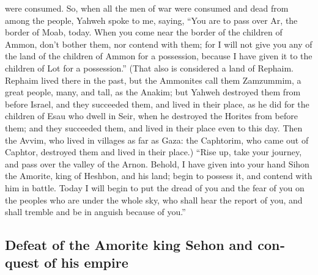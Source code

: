 \begin{paracol}{2}
\begin{otherlanguage}{english}
were consumed.  So, when all the men of war were consumed
and dead from among the people,  Yahweh spoke to me,
saying,  ``You are to pass over Ar, the border of Moab,
today.  When you come near the border of the children of
Ammon, don't bother them, nor contend with them; for I will not give you
any of the land of the children of Ammon for a possession, because I
have given it to the children of Lot for a possession.'' 
(That also is considered a land of Rephaim. Rephaim lived there in the
past, but the Ammonites call them Zamzummim,  a great
people, many, and tall, as the Anakim; but Yahweh destroyed them from
before Israel, and they succeeded them, and lived in their place,
 as he did for the children of Esau who dwell in Seir,
when he destroyed the Horites from before them; and they succeeded them,
and lived in their place even to this day.  Then the
Avvim, who lived in villages as far as Gaza: the Caphtorim, who came out
of Caphtor, destroyed them and lived in their place.) 
``Rise up, take your journey, and pass over the valley of the Arnon.
Behold, I have given into your hand Sihon the Amorite, king of Heshbon,
and his land; begin to possess it, and contend with him in battle.
 Today I will begin to put the dread of you and the fear
of you on the peoples who are under the whole sky, who shall hear the
report of you, and shall tremble and be in anguish because of you.''

\hypertarget{defeat-of-the-amorite-king-sehon-and-conquest-of-his-empire}{%
\subsection{Defeat of the Amorite king Sehon and conquest of his
empire}\label{defeat-of-the-amorite-king-sehon-and-conquest-of-his-empire}}


\end{otherlanguage}
\end{paracol}
